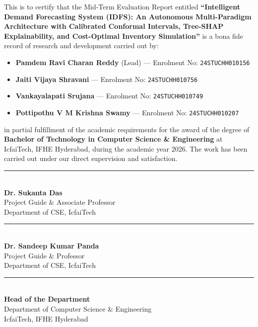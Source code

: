 \documentclass[12pt,a4paper,oneside]{report}
\theoremstyle{definition}
\begin{document}
\noindent This is to certify that the Mid-Term Evaluation Report entitled \textbf{``Intelligent Demand Forecasting System (IDFS): An Autonomous Multi-Paradigm Architecture with Calibrated Conformal Intervals, Tree-SHAP Explainability, and Cost-Optimal Inventory Simulation''} is a bona fide record of research and development carried out by:
\begin{itemize}[itemsep=0.2cm, topsep=0.2cm]
    \item \textbf{Pamdem Ravi Charan Reddy} (Lead) --- Enrolment No: \texttt{24STUCHH010156}
    \item \textbf{Jaiti Vijaya Shravani} --- Enrolment No: \texttt{24STUCHH010756}
    \item \textbf{Vankayalapati Srujana} --- Enrolment No: \texttt{24STUCHH010749}
    \item \textbf{Pottipothu V M Krishna Swamy} --- Enrolment No: \texttt{24STUCHH010207}
\end{itemize}
in partial fulfillment of the academic requirements for the award of the degree of \textbf{Bachelor of Technology in Computer Science \& Engineering} at IcfaiTech, IFHE Hyderabad, during the academic year 2026. The work has been carried out under our direct supervision and satisfaction.

\vspace{3.0cm}

\noindent
\begin{minipage}{0.48\textwidth}
    \rule{6cm}{0.4pt}\\
    \textbf{Dr. Sukanta Das}\\
    Project Guide \& Associate Professor\\
    Department of CSE, IcfaiTech
\end{minipage}
\hfill
\begin{minipage}{0.48\textwidth}
    \begin{flushright}
        \rule{6cm}{0.4pt}\\
        \textbf{Dr. Sandeep Kumar Panda}\\
        Project Guide \& Professor\\
        Department of CSE, IcfaiTech
    \end{flushright}
\end{minipage}

\vspace{2.0cm}

\noindent
\begin{center}
    \rule{7cm}{0.4pt}\\
    \textbf{Head of the Department}\\
    Department of Computer Science \& Engineering\\
    IcfaiTech, IFHE Hyderabad
\end{center}
\end{document}
